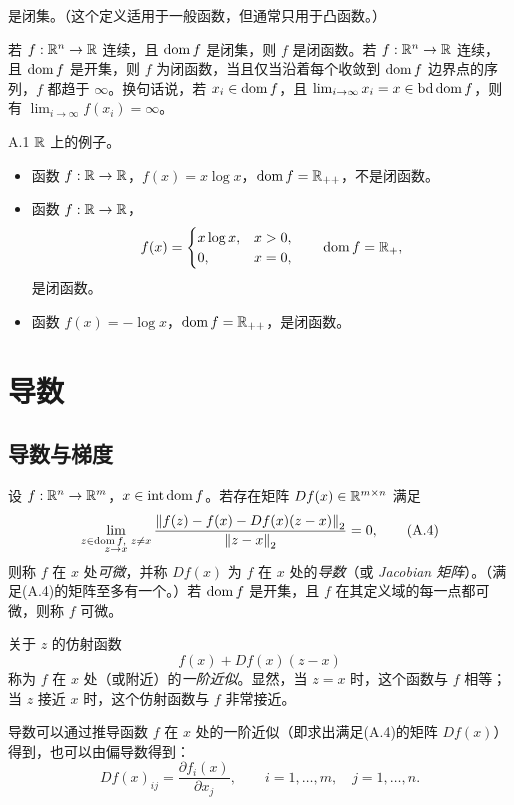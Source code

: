 是闭集。（这个定义适用于一般函数，但通常只用于凸函数。）

若 $f:\mathbb R^n\to\mathbb R$ 连续，且 $\operatorname{dom} f$ 是闭集，则 $f$ 是闭函数。若 $f:\mathbb R^n\to\mathbb R$ 连续，且 $\operatorname{dom} f$ 是开集，则 $f$ 为闭函数，当且仅当沿着每个收敛到 $\operatorname{dom} f$ 边界点的序列，$f$ 都趋于 $\infty$。换句话说，若 $x_i\in\operatorname{dom} f$，且 $\lim_{i\to\infty}x_i=x\in\operatorname{bd}\operatorname{dom} f$，则有 $\lim_{i\to\infty}f(x_i)=\infty$。

\begin{origexample}{A.1}
$\mathbb R$ 上的例子。
\begin{itemize}
\item 函数 $f:\mathbb R\to\mathbb R$，$f(x)=x\log x$，$\operatorname{dom} f=\mathbb R_{++}$，不是闭函数。
\item 函数 $f:\mathbb R\to\mathbb R$，
\[
 f(x)=\begin{cases}x\log x,&x>0,\\0,&x=0,\end{cases}
 \qquad\operatorname{dom} f=\mathbb R_+,
\]
是闭函数。
\item 函数 $f(x)=-\log x$，$\operatorname{dom} f=\mathbb R_{++}$，是闭函数。
\end{itemize}
\end{origexample}

\section{导数}
\subsection{导数与梯度}
设 $f:\mathbb R^n\to\mathbb R^m$，$x\in\operatorname{int}\operatorname{dom} f$。若存在矩阵 $Df(x)\in\mathbb R^{m\times n}$ 满足
\begin{equation}
 \lim_{\substack{z\in\operatorname{dom} f,\ z\neq x\\z\to x}}
 \frac{\left\lVert f(z)-f(x)-Df(x)(z-x)\right\rVert_2}{\left\lVert z-x\right\rVert_2}=0,\tag{A.4}
\end{equation}
则称 $f$ 在 $x$ 处\emph{可微}，并称 $Df(x)$ 为 $f$ 在 $x$ 处的\emph{导数}（或 \emph{Jacobian 矩阵}）。（满足(A.4)的矩阵至多有一个。）若 $\operatorname{dom} f$ 是开集，且 $f$ 在其定义域的每一点都可微，则称 $f$ 可微。

关于 $z$ 的仿射函数
\[
 f(x)+Df(x)(z-x)
\]
称为 $f$ 在 $x$ 处（或附近）的\emph{一阶近似}。显然，当 $z=x$ 时，这个函数与 $f$ 相等；当 $z$ 接近 $x$ 时，这个仿射函数与 $f$ 非常接近。

导数可以通过推导函数 $f$ 在 $x$ 处的一阶近似（即求出满足(A.4)的矩阵 $Df(x)$）得到，也可以由偏导数得到：
\[
 Df(x)_{ij}=\frac{\partial f_i(x)}{\partial x_j},\qquad
 i=1,\ldots,m,\quad j=1,\ldots,n.
\]

